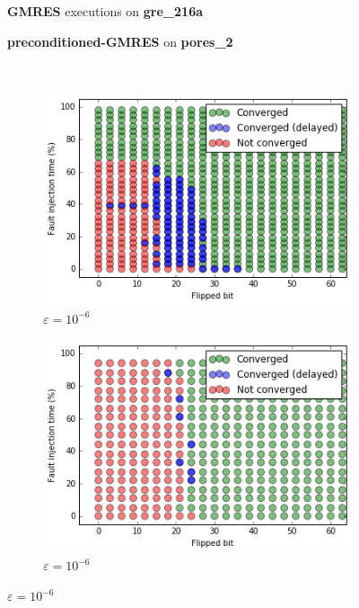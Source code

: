 \begin{figure}[ht] 
\hspace{3ex}
\begin{minipage}[b]{0.5\linewidth}
\centering
\textbf{GMRES} executions on \textbf{gre_216a} 
\end{minipage}
\quad
\begin{minipage}{0.5\linewidth}
\centering
\textbf{preconditioned-GMRES} on \textbf{pores_2}
\end{minipage}\\

  \begin{subfigure}[b]{0.5\linewidth}
    \centering
	\includegraphics[width=\linewidth]{figures/gre_216a/bit_iteration_0.png} %
	\caption{$\varepsilon = 10^{-6}$}
    \label{fig:gre_216a_bit_iteration_0}	
  \end{subfigure}%
   \hspace{4ex}
  \begin{subfigure}[b]{0.5\linewidth}
    \centering
    \includegraphics[width=\linewidth]{figures/pores_2/bit_iteration_0.png} %
	\caption{$\varepsilon = 10^{-6}$}
    \label{fig:pores_2_bit_iteration_0}	
  \end{subfigure} 


\end{figure}
